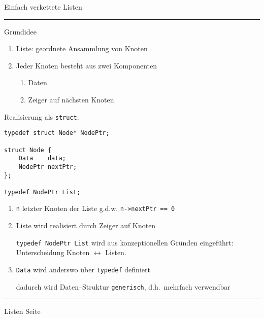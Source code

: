 \begin{slide}{}
\normalsize

\begin{center}
Einfach verkettete Listen
\end{center}


\rule{17cm}{1mm}

\footnotesize
\vspace*{0.2cm}
Grundidee
\begin{enumerate}
\item Liste: geordnete Ansammlung von Knoten
\item Jeder Knoten besteht aus zwei Komponenten
  \begin{enumerate}
  \item Daten
  \item Zeiger auf n\"achsten Knoten
  \end{enumerate}
\end{enumerate}
Realisierung als \texttt{struct}:
\begin{verbatim}
typedef struct Node* NodePtr;

struct Node {
    Data    data;
    NodePtr nextPtr;
};

typedef NodePtr List;
\end{verbatim}
\begin{enumerate}
\item \texttt{n} letzter Knoten der Liste g.d.w. \texttt{n->nextPtr == 0}
\item Liste wird realisiert durch Zeiger auf Knoten

      \texttt{typedef NodePtr List} wird aus konzeptionellen Gr\"unden
      eingef\"uhrt:  Unterscheidung Knoten $\longleftrightarrow$ Listen.
\item \texttt{Data} wird anderswo \"uber \texttt{typedef} definiert

      dadurch wird Daten--Struktur \texttt{generisch}, 
      d.h.~mehrfach verwendbar
\end{enumerate}

\vspace*{\fill}
\tiny \addtocounter{mypage}{1}
\rule{17cm}{1mm}
Listen  \hspace*{\fill} Seite 
\end{slide}


